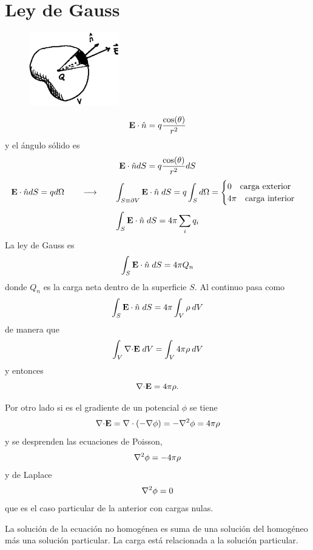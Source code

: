 \documentclass[10pt,oneside]{CBFT_book}
\begin{document}
\section{Ley de Gauss}



\begin{figure}[htb]
	\begin{center}
	\includegraphics[width=0.35\textwidth]{images/fig_ft1_gauss.pdf}	 
	\end{center}
	\caption{}
\end{figure} 
\[
	\vb{E} \cdot \hat{n} = q \frac{\cos(\theta)}{r^2}
\]
y el ángulo sólido es
\[
	\vb{E} \cdot \hat{n} dS = q \frac{\cos(\theta)}{r^2} dS
\]
\[
	\vb{E} \cdot \hat{n} dS = q d\Omega \qquad \longrightarrow \qquad 
	\int_{S\equiv\partial V} \vb{E} \cdot \hat{n} \; dS = q \int_S d\Omega =
	\begin{cases}
	 0 \quad \textrm{carga exterior}\\
	 4\pi \quad \textrm{carga interior}
	\end{cases}
\]
\[
	\int_S \vb{E} \cdot \hat{n} \; dS = 4\pi \sum_i q_i
\]
La ley de Gauss es
\[
	\int_S \vb{E} \cdot \hat{n} \; dS = 4\pi Q_n
\]
donde $Q_n$ es la carga neta dentro de la superficie $S$. Al continuo pasa como 
\[
	\int_S \vb{E} \cdot \hat{n} \; dS = 4\pi \int_V \rho \: dV
\]
de manera que 
\[
	\int_V \mathbf{\nabla}\mathbf{\cdot}\mathbf{E} \; dV = \int_V 4\pi \rho \: dV
\]
y entonces
\[
	\mathbf{\nabla}\mathbf{\cdot}\mathbf{E} = 4\pi \rho.
\]

Por otro lado si  es el gradiente de un potencial $\phi$ se tiene
\[
	\mathbf{\nabla}\mathbf{\cdot}\mathbf{E} = \mathbf{\nabla}\cdot{(-\mathbf{\nabla}\phi)} = - \nabla^2{\phi} = 4\pi \rho
\]
y se desprenden las ecuaciones de Poisson,
\[
	\nabla^2{\phi} = -4\pi \rho
\]
y de Laplace
\[
	\nabla^2{\phi} = 0
\]
que es el caso particular de la anterior con cargas nulas.

La solución de la ecuación no homogénea es suma de una solución del homogéneo más una solución
particular. La carga está relacionada a la solución particular.
\end{document}
